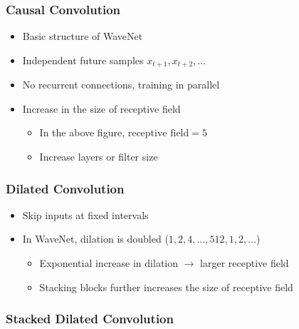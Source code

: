 \documentclass[dvipdfmx]{beamer}
\begin{document}
\begin{frame}
    \frametitle{Causal Convolution}
    \begin{itemize}
        \item Basic structure of WaveNet
        \item Independent future samples $x_{t+1}, x_{t+2}, \ldots$
        \item No recurrent connections, training in parallel
    \end{itemize}
    \begin{itemize}
        \item Increase in the size of receptive field
        \begin{itemize}
            \item In the above figure, $\text{receptive field} = 5$
            \item Increase layers or filter size
        \end{itemize}
    \end{itemize}
\end{frame}


\begin{frame}
    \frametitle{Dilated Convolution}
    \begin{itemize}
        \item Skip inputs at fixed intervals
        \item In WaveNet, dilation is doubled ($1, 2, 4, \ldots, 512, 1, 2, \ldots$)
        \begin{itemize}
            \item Exponential increase in dilation $\to$ larger receptive field
            \item Stacking blocks further increases the size of receptive field
        \end{itemize}
    \end{itemize}
\end{frame}


\begin{frame}
    \frametitle{Stacked Dilated Convolution}
\end{frame}
\end{document}
